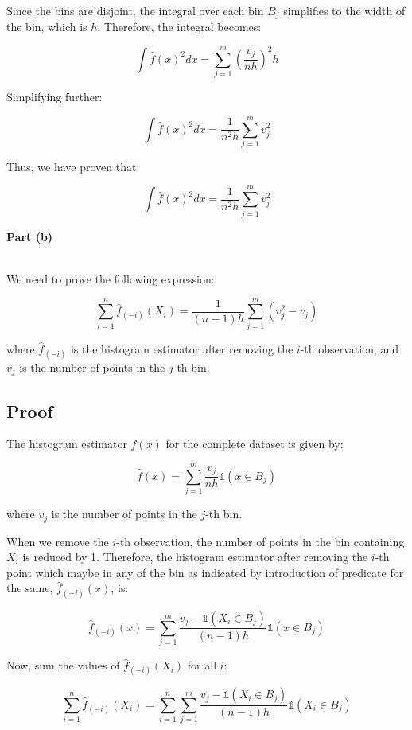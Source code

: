\documentclass[a4paper,12pt,answers]{exam}
\begin{document}
\begin{questions}
\begin{solution}
Since the bins are disjoint, the integral over each bin \( B_j \) simplifies to the width of the bin, which is \( h \). Therefore, the integral becomes:

\[
\int \hat{f}(x)^2 dx = \sum_{j=1}^{m} \left( \frac{v_j}{nh} \right)^2 h
\]

Simplifying further:

\[
\int \hat{f}(x)^2 dx = \frac{1}{n^2 h} \sum_{j=1}^{m} v_j^2
\]

Thus, we have proven that:

\[
\int \hat{f}(x)^2 dx = \frac{1}{n^2 h} \sum_{j=1}^{m} v_j^2
\]

\end{solution}

\textbf{Part (b)}
\begin{solution}\\

We need to prove the following expression:

\[
\sum_{i=1}^n \hat{f}_{(-i)}(X_i) = \frac{1}{(n-1)h} \sum_{j=1}^m \left( v_j^2 - v_j \right)
\]

where \( \hat{f}_{(-i)} \) is the histogram estimator after removing the \( i \)-th observation, and \( v_j \) is the number of points in the \( j \)-th bin.

\subsection*{Proof}

The histogram estimator \( \hat{f}(x) \) for the complete dataset is given by:

\[
\hat{f}(x) = \sum_{j=1}^m \frac{v_j}{nh} \mathds{1}(x \in B_j)
\]

where \( v_j \) is the number of points in the \( j \)-th bin.

When we remove the \( i \)-th observation, the number of points in the bin containing \( X_i \) is reduced by 1. Therefore, the histogram estimator after removing the \( i \)-th point which maybe in any of the bin as indicated by introduction of predicate for the same, \( \hat{f}_{(-i)}(x) \), is:

\[
\hat{f}_{(-i)}(x) = \sum_{j=1}^m \frac{v_j - \mathds{1}(X_i \in B_j)}{(n-1)h} \mathds{1}(x \in B_j)
\]


Now, sum the values of \( \hat{f}_{(-i)}(X_i) \) for all \( i \):

\[
\sum_{i=1}^n \hat{f}_{(-i)}(X_i) = \sum_{i=1}^n \sum_{j=1}^m \frac{v_j - \mathds{1}(X_i \in B_j)}{(n-1)h} \mathds{1}(X_i \in B_j)
\]


\end{solution}
\end{questions}
\end{document}
